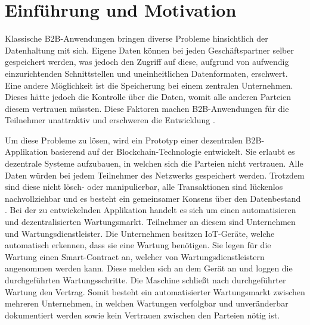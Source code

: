 \chapter{Einführung und Motivation}
\label{cha:einfuehrung}


Klassische B2B-Anwendungen bringen diverse Probleme hinsichtlich der Datenhaltung mit sich. Eigene Daten können bei jeden Geschäftspartner selber gespeichert werden, was jedoch den Zugriff auf diese, aufgrund von aufwendig einzurichtenden Schnittstellen und uneinheitlichen Datenformaten, erschwert. Eine andere Möglichkeit ist die Speicherung bei einem zentralen Unternehmen. Dieses hätte jedoch die Kontrolle über die Daten, womit alle anderen Parteien diesem vertrauen müssten. Diese Faktoren machen B2B-Anwendungen für die Teilnehmer unattraktiv und erschweren die Entwicklung \cite{KorpelaDigitalSupplyChain2017} \cite{WustyouneedBlockchain2017} \cite{NetEDIHowAPIare2017}.

Um diese Probleme zu lösen, wird ein Prototyp einer dezentralen B2B-Applikation basierend auf der Blockchain-Technologie entwickelt. Sie erlaubt es dezentrale Systeme aufzubauen, in welchen sich die Parteien nicht vertrauen. Alle Daten würden bei jedem Teilnehmer des Netzwerks gespeichert werden. Trotzdem sind diese nicht lösch- oder manipulierbar, alle Transaktionen sind lückenlos nachvollziehbar und es besteht ein gemeinsamer Konsens über den Datenbestand \cite{CrosbyBlockChainTechnologyBitcoin2016}. Bei der zu entwickelnden Applikation handelt es sich um einen automatisieren und dezentralisierten Wartungsmarkt. Teilnehmer an diesem sind Unternehmen und Wartungsdienstleister. Die Unternehmen besitzen IoT-Geräte, welche automatisch erkennen, dass sie eine Wartung benötigen. Sie legen für die Wartung einen Smart-Contract an, welcher von Wartungsdienstleistern angenommen werden kann. Diese melden sich an dem Gerät an und loggen die durchgeführten Wartungsschritte. Die Maschine schließt nach durchgeführter Wartung den Vertrag. Somit besteht ein automatisierter Wartungsmarkt zwischen mehreren Unternehmen, in welchen Wartungen verfolgbar und unveränderbar dokumentiert werden sowie kein Vertrauen zwischen den Parteien nötig ist.

